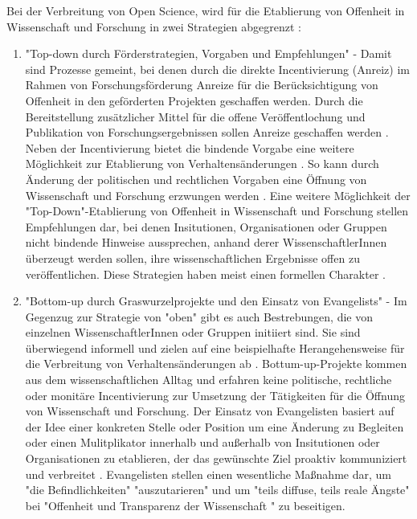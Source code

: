 Bei der Verbreitung von Open Science, wird für die Etablierung von Offenheit in Wissenschaft und Forschung in zwei Strategien abgegrenzt \cite{schulze_2013_open}: 
\begin{enumerate}
\item "Top-down durch Förderstrategien, Vorgaben und Empfehlungen" - 
Damit sind Prozesse gemeint, bei denen durch die direkte Incentivierung (Anreiz) im Rahmen von Forschungsförderung Anreize für die Berücksichtigung von Offenheit in den geförderten Projekten geschaffen werden. Durch die Bereitstellung zusätzlicher Mittel für die offene Veröffentlochung und Publikation von Forschungsergebnissen sollen Anreize geschaffen werden \cite{suchen}. Neben der Incentivierung bietet die bindende Vorgabe eine weitere Möglichkeit zur Etablierung von Verhaltensänderungen \cite{suchen}. So kann durch Änderung der politischen und rechtlichen Vorgaben eine Öffnung von Wissenschaft und Forschung erzwungen werden \cite{suchen}. Eine weitere Möglichkeit der "Top-Down"-Etablierung von Offenheit in Wissenschaft und Forschung stellen Empfehlungen dar, bei denen Insitutionen, Organisationen oder Gruppen nicht bindende Hinweise aussprechen, anhand derer WissenschaftlerInnen überzeugt werden sollen, ihre wissenschaftlichen Ergebnisse offen zu veröffentlichen. Diese Strategien haben meist einen formellen Charakter \cite{suchen}.
\item "Bottom-up durch Graswurzelprojekte und den Einsatz von Evangelists" - 
Im Gegenzug zur Strategie von "oben" gibt es auch Bestrebungen, die von einzelnen WissenschaftlerInnen oder Gruppen initiiert sind. Sie sind überwiegend informell und zielen auf eine beispielhafte Herangehensweise für die Verbreitung von Verhaltensänderungen ab \cite{suchen}. Bottum-up-Projekte kommen aus dem wissenschaftlichen Alltag und erfahren keine politische, rechtliche oder monitäre Incentivierung zur Umsetzung der Tätigkeiten für die Öffnung von Wissenschaft und Forschung. Der Einsatz von Evangelisten basiert auf der Idee einer konkreten Stelle oder Position um eine Änderung zu Begleiten \cite{suchen} oder einen Mulitplikator innerhalb und außerhalb von Insitutionen oder Organisationen zu etablieren, der das gewünschte Ziel proaktiv kommuniziert und verbreitet \cite{suchen}. Evangelisten stellen einen wesentliche Maßnahme dar, um "die Befindlichkeiten" "auszutarieren" und um "teils diffuse, teils reale Ängste" bei "Offenheit und Transparenz der Wissenschaft "\cite{schulze_2013_open} zu beseitigen.
\end{enumerate} 

